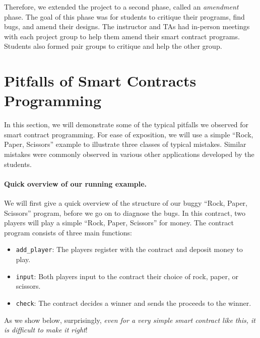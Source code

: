 \documentclass[10pt,twocolumn,letterpaper]{article}
\begin{document}
Therefore, we extended the project to a second phase, called 
an {\it amendment} phase. 
The goal of this phase was for students to critique their programs,
find bugs, and amend their designs. 
The instructor and TAs had in-person meetings with each project group
to help them amend their smart contract programs.  
Students also formed pair groups to critique and 
help the other group. 



\section{Pitfalls of Smart Contracts Programming}
In this section, we will demonstrate some of the typical pitfalls
we observed for smart contract programming. 
For ease of exposition, we will use
a simple ``Rock, Paper, Scissors''  
example to illustrate three classes of typical mistakes.
Similar mistakes 
were commonly observed in various other 
applications developed by the students.  

\paragraph{Quick overview of our running example.}
We will first give a quick overview of the structure
of our buggy ``Rock, Paper, Scissors'' program, before
we go on to diagnose the bugs.
In this contract, two players 
will play a simple 
``Rock, Paper, Scissors''
for money. 
The contract program consists of three main functions:
\begin{itemize}
\item
{\tt add\_player}:
The players register with the contract
and deposit money to play.
\item
{\tt input}:
Both players input to the contract 
their choice of rock, paper, or scissors.
\item
{\tt check}:
The contract decides a winner
and sends the proceeds to the winner. 
\end{itemize}

As we show below, 
surprisingly, {\it even for a very simple smart contract like this, 
it is difficult 
to make it right}!
\end{document}
